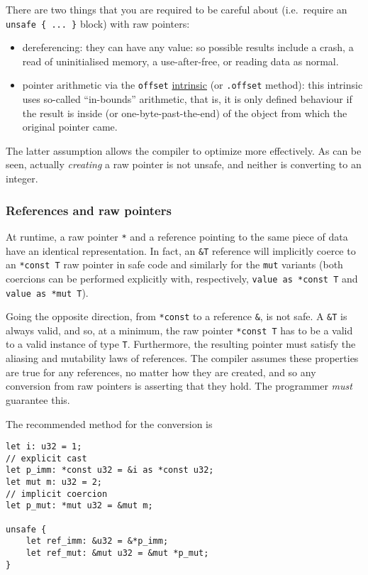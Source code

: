 \documentclass[]{article}
\begin{document}
There are two things that you are required to be careful about
(i.e.~require an \texttt{unsafe \{ ... \}} block) with raw pointers:

\begin{itemize}
\itemsep1pt\parskip0pt
\item
  dereferencing: they can have any value: so possible results include a
  crash, a read of uninitialised memory, a use-after-free, or reading
  data as normal.
\item
  pointer arithmetic via the \texttt{offset}
  \hyperref[intrinsics]{intrinsic} (or \texttt{.offset} method): this
  intrinsic uses so-called ``in-bounds'' arithmetic, that is, it is only
  defined behaviour if the result is inside (or one-byte-past-the-end)
  of the object from which the original pointer came.
\end{itemize}

The latter assumption allows the compiler to optimize more effectively.
As can be seen, actually \emph{creating} a raw pointer is not unsafe,
and neither is converting to an integer.

\subsubsection{References and raw
pointers}\label{references-and-raw-pointers}

At runtime, a raw pointer \texttt{*} and a reference pointing to the
same piece of data have an identical representation. In fact, an
\texttt{\&T} reference will implicitly coerce to an \texttt{*const T}
raw pointer in safe code and similarly for the \texttt{mut} variants
(both coercions can be performed explicitly with, respectively,
\texttt{value as *const T} and \texttt{value as *mut T}).

Going the opposite direction, from \texttt{*const} to a reference
\texttt{\&}, is not safe. A \texttt{\&T} is always valid, and so, at a
minimum, the raw pointer \texttt{*const T} has to be a valid to a valid
instance of type \texttt{T}. Furthermore, the resulting pointer must
satisfy the aliasing and mutability laws of references. The compiler
assumes these properties are true for any references, no matter how they
are created, and so any conversion from raw pointers is asserting that
they hold. The programmer \emph{must} guarantee this.

The recommended method for the conversion is

\begin{verbatim}
let i: u32 = 1;
// explicit cast
let p_imm: *const u32 = &i as *const u32;
let mut m: u32 = 2;
// implicit coercion
let p_mut: *mut u32 = &mut m;

unsafe {
    let ref_imm: &u32 = &*p_imm;
    let ref_mut: &mut u32 = &mut *p_mut;
}
\end{verbatim}
\end{document}
